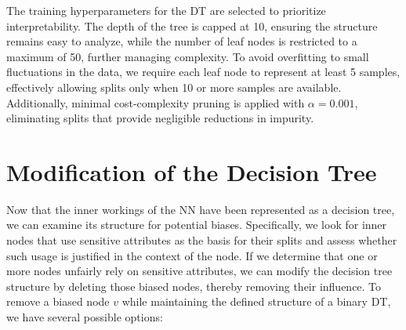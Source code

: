 The training hyperparameters for the DT are selected to prioritize interpretability.
The depth of the tree is capped at 10, ensuring the structure remains easy to analyze,
while the number of leaf nodes is restricted to a maximum of 50, further managing complexity.
To avoid overfitting to small fluctuations in the data,
we require each leaf node to represent at least 5 samples,
effectively allowing splits only when 10 or more samples are available.
Additionally, minimal cost-complexity pruning is applied with $\alpha=0.001$,
eliminating splits that provide negligible reductions in impurity.


\section{Modification of the Decision Tree}
\label{sec:modification}
Now that the inner workings of the NN have been represented as a decision tree,
we can examine its structure for potential biases.
Specifically, we look for inner nodes that use sensitive attributes as the basis for their splits
and assess whether such usage is justified in the context of the node.
If we determine that one or more nodes unfairly rely on sensitive attributes,
we can modify the decision tree structure by deleting those biased nodes,
thereby removing their influence.
To remove a biased node $v$ while maintaining the defined structure of a binary DT,
we have several possible options:

